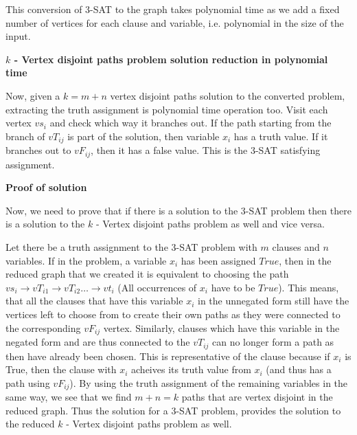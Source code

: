 \documentclass{imports}
\begin{document}
    This conversion of 3-SAT to the graph takes polynomial time as we add a fixed number of vertices for each clause and variable,
    i.e. polynomial in the size of the input. \vspace{10pt}

    \textbf{$k$ - Vertex disjoint paths problem solution reduction in polynomial time}\vspace{10pt}

    Now, given a $k = m+n$ vertex disjoint paths solution to the converted problem, extracting the truth assignment is polynomial time
    operation too. Visit each vertex $vs_i$ and check which way it branches out. If the path starting from the branch of $vT_{ij}$ is part of the solution, then variable $x_i$ has a truth value. If it branches out to $vF_{ij}$, then it has a false value. This is the 3-SAT satisfying assignment.
    \vspace{10pt}

    \textbf{Proof of solution} \vspace{10pt}

    Now, we need to prove that if there is a solution to the 3-SAT problem then there is a solution to the $k$ - Vertex disjoint paths problem as well and vice versa.\vspace{10pt}

    Let there be a truth assignment to the 3-SAT problem with $m$ clauses and $n$ variables. If in the problem, a variable $x_i$ has been assigned $True$, then in the reduced graph that we created it is equivalent to choosing the path $vs_i \to vT_{i1} \to  vT_{i2} \dots \to vt_i$ (All occurrences of $x_i$ have to be $True$). This means, that all the clauses that have this variable $x_i$ in the unnegated form still have the vertices left to choose from to create their own paths as they were connected to the corresponding $vF_{ij}$ vertex. Similarly, clauses which have this variable in the negated form and are thus connected to the $vT_{ij}$ can no longer form a  path as then have already been chosen. This is representative of the clause because if $x_i$ is True, then the clause with $x_i$ acheives its truth value from $x_i$ (and thus has a path using $vF_{ij}$). By using the truth assignment of the remaining variables in the same way, we see that we find $m+n=k$ paths that are vertex disjoint in the reduced graph. Thus the solution for a 3-SAT problem, provides the solution to the reduced $k$ - Vertex disjoint paths problem as well. \vspace{10pt}
\end{document}

